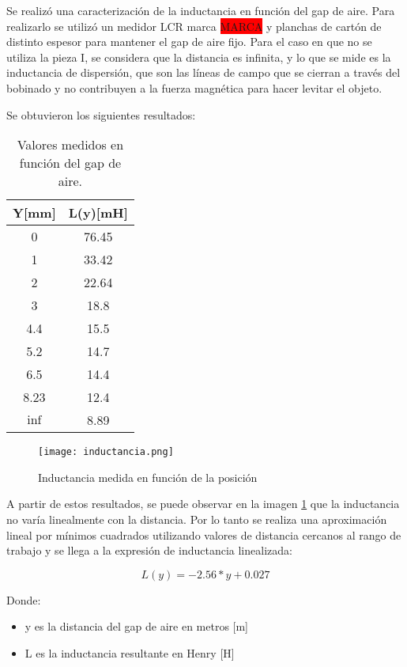 \noindent Se realizó una caracterización de la inductancia en función del gap de aire. Para realizarlo se utilizó un medidor LCR marca \colorbox{red}{MARCA} y planchas de cartón de distinto espesor para mantener el gap de aire fijo. Para el caso en que no se utiliza la pieza I, se considera que la distancia es infinita, y lo que se mide es la inductancia de dispersión, que son las líneas de campo que se cierran a través del bobinado y no contribuyen a la fuerza magnética para hacer levitar el objeto.

\noindent Se obtuvieron los siguientes resultados:


\begin{table} [H]
	\begin{center}
		\begin{tabular}{| c | c |}
			\hline
			Y[mm] & L(y)[mH]\\ \hline
			0 & 76.45\\ \hline
			1 & 33.42\\ \hline
			2 & 22.64\\ \hline
			3 & 18.8\\ \hline
			4.4 & 15.5\\ \hline
			5.2 & 14.7\\ \hline
			6.5 & 14.4\\ \hline
			8.23 & 12.4\\ \hline
			$\inf$ & 8.89\\ \hline
		\end{tabular}
	\caption{Valores medidos en función del gap de aire.}
	\label{tab_mediciones_inductancia}
	\end{center}
\end{table}

\begin{figure} [H]
	\centering
	\texttt{[image: inductancia.png]}
	\caption{Inductancia medida en función de la posición}
	\label{fig:img_inductancia_medida}
\end{figure}
\noindent A partir de estos resultados, se puede observar en la imagen \ref{fig:img_inductancia_medida} que la inductancia no varía linealmente con la distancia. Por lo tanto se realiza una aproximación lineal por mínimos cuadrados utilizando valores de distancia cercanos al rango de trabajo y se llega a la expresión de inductancia linealizada:

\begin{equation}
	L(y)=-2.56*y+0.027
\end{equation}

\noindent Donde:
\begin{itemize}
	\item y es la distancia del gap de aire en metros [m]
	\item L es la inductancia resultante en Henry [H]
\end{itemize}


